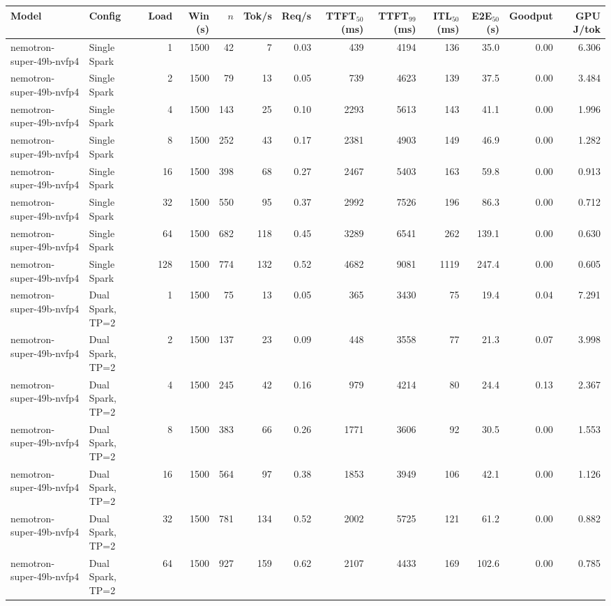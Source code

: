 \begin{tabular}{l l r r r r r r r r r r r}
\toprule
Model & Config & Load & Win (s) & $n$ & Tok/s & Req/s & TTFT$_{50}$ (ms) & TTFT$_{99}$ (ms) & ITL$_{50}$ (ms) & E2E$_{50}$ (s) & Goodput & GPU J/tok \\
\midrule
nemotron-super-49b-nvfp4 & Single Spark & 1 & 1500 & 42\rlap{$^\dagger$} & 7 & 0.03 & 439 & 4194 & 136 & 35.0 & 0.00 & 6.306 \\
nemotron-super-49b-nvfp4 & Single Spark & 2 & 1500 & 79\rlap{$^\dagger$} & 13 & 0.05 & 739 & 4623 & 139 & 37.5 & 0.00 & 3.484 \\
nemotron-super-49b-nvfp4 & Single Spark & 4 & 1500 & 143 & 25 & 0.10 & 2293 & 5613 & 143 & 41.1 & 0.00 & 1.996 \\
nemotron-super-49b-nvfp4 & Single Spark & 8 & 1500 & 252 & 43 & 0.17 & 2381 & 4903 & 149 & 46.9 & 0.00 & 1.282 \\
nemotron-super-49b-nvfp4 & Single Spark & 16 & 1500 & 398 & 68 & 0.27 & 2467 & 5403 & 163 & 59.8 & 0.00 & 0.913 \\
nemotron-super-49b-nvfp4 & Single Spark & 32 & 1500 & 550 & 95 & 0.37 & 2992 & 7526 & 196 & 86.3 & 0.00 & 0.712 \\
nemotron-super-49b-nvfp4 & Single Spark & 64 & 1500 & 682 & 118 & 0.45 & 3289 & 6541 & 262 & 139.1 & 0.00 & 0.630 \\
nemotron-super-49b-nvfp4 & Single Spark & 128 & 1500 & 774 & 132 & 0.52 & 4682 & 9081 & 1119 & 247.4 & 0.00 & 0.605 \\
\addlinespace
nemotron-super-49b-nvfp4 & Dual Spark, TP=2 & 1 & 1500 & 75\rlap{$^\dagger$} & 13 & 0.05 & 365 & 3430 & 75 & 19.4 & 0.04 & 7.291 \\
nemotron-super-49b-nvfp4 & Dual Spark, TP=2 & 2 & 1500 & 137 & 23 & 0.09 & 448 & 3558 & 77 & 21.3 & 0.07 & 3.998 \\
nemotron-super-49b-nvfp4 & Dual Spark, TP=2 & 4 & 1500 & 245 & 42 & 0.16 & 979 & 4214 & 80 & 24.4 & 0.13 & 2.367 \\
nemotron-super-49b-nvfp4 & Dual Spark, TP=2 & 8 & 1500 & 383 & 66 & 0.26 & 1771 & 3606 & 92 & 30.5 & 0.00 & 1.553 \\
nemotron-super-49b-nvfp4 & Dual Spark, TP=2 & 16 & 1500 & 564 & 97 & 0.38 & 1853 & 3949 & 106 & 42.1 & 0.00 & 1.126 \\
nemotron-super-49b-nvfp4 & Dual Spark, TP=2 & 32 & 1500 & 781 & 134 & 0.52 & 2002 & 5725 & 121 & 61.2 & 0.00 & 0.882 \\
nemotron-super-49b-nvfp4 & Dual Spark, TP=2 & 64 & 1500 & 927 & 159 & 0.62 & 2107 & 4433 & 169 & 102.6 & 0.00 & 0.785 \\

\end{tabular}
